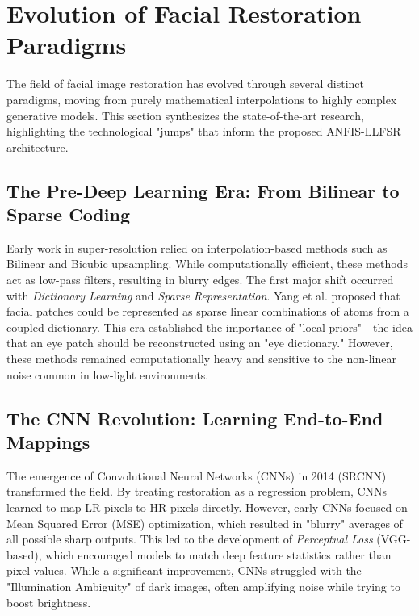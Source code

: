 \section{Evolution of Facial Restoration Paradigms}
The field of facial image restoration has evolved through several distinct paradigms, moving from purely mathematical interpolations to highly complex generative models. This section synthesizes the state-of-the-art research, highlighting the technological "jumps" that inform the proposed ANFIS-LLFSR architecture.

\subsection{The Pre-Deep Learning Era: From Bilinear to Sparse Coding}
Early work in super-resolution relied on interpolation-based methods such as Bilinear and Bicubic upsampling. While computationally efficient, these methods act as low-pass filters, resulting in blurry edges. The first major shift occurred with \textit{Dictionary Learning} and \textit{Sparse Representation}. Yang et al. \cite{yang2010image} proposed that facial patches could be represented as sparse linear combinations of atoms from a coupled dictionary. This era established the importance of "local priors"—the idea that an eye patch should be reconstructed using an "eye dictionary." However, these methods remained computationally heavy and sensitive to the non-linear noise common in low-light environments.

\subsection{The CNN Revolution: Learning End-to-End Mappings}
The emergence of Convolutional Neural Networks (CNNs) in 2014 (SRCNN) transformed the field. By treating restoration as a regression problem, CNNs learned to map LR pixels to HR pixels directly. However, early CNNs focused on Mean Squared Error (MSE) optimization, which resulted in "blurry" averages of all possible sharp outputs. This led to the development of \textit{Perceptual Loss} (VGG-based), which encouraged models to match deep feature statistics rather than pixel values. While a significant improvement, CNNs struggled with the "Illumination Ambiguity" of dark images, often amplifying noise while trying to boost brightness.

